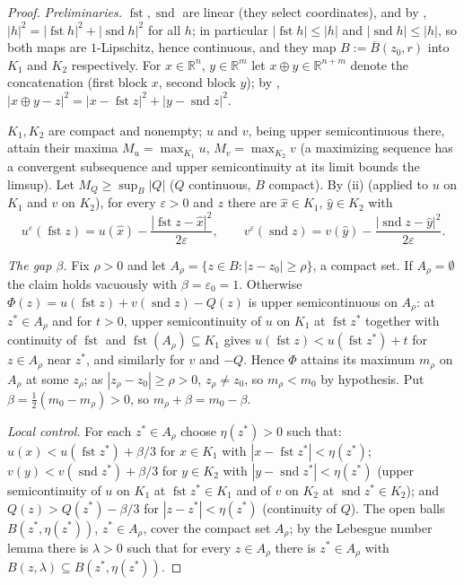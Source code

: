\begin{proof}
\emph{Preliminaries.} $\operatorname{fst},\operatorname{snd}$ are linear (they select coordinates), and by , $|h|^2=|\operatorname{fst}h|^2+|\operatorname{snd}h|^2$ for all $h$; in particular $|\operatorname{fst}h|\le|h|$ and $|\operatorname{snd}h|\le|h|$, so both maps are $1$-Lipschitz, hence continuous, and they map $B:=\overline B(z_0,r)$ into $K_1$ and $K_2$ respectively. For $x\in\mathbb R^n$, $y\in\mathbb R^m$ let $x\oplus y\in\mathbb R^{n+m}$ denote the concatenation (first block $x$, second block $y$); by , $|x\oplus y-z|^2=|x-\operatorname{fst}z|^2+|y-\operatorname{snd}z|^2$.

$K_1,K_2$ are compact and nonempty; $u$ and $v$, being upper semicontinuous there, attain their maxima $M_u=\max_{K_1}u$, $M_v=\max_{K_2}v$ (a maximizing sequence has a convergent subsequence and upper semicontinuity at its limit bounds the limsup). Let $M_Q\ge\sup_B|Q|$ ($Q$ continuous, $B$ compact). By (ii) (applied to $u$ on $K_1$ and $v$ on $K_2$), for every $\varepsilon>0$ and $z$ there are $\hat x\in K_1$, $\hat y\in K_2$ with
\[
u^\varepsilon(\operatorname{fst}z)=u(\hat x)-\frac{|\operatorname{fst}z-\hat x|^2}{2\varepsilon},\qquad v^\varepsilon(\operatorname{snd}z)=v(\hat y)-\frac{|\operatorname{snd}z-\hat y|^2}{2\varepsilon}. \tag{1}
\]

\emph{The gap $\beta$.} Fix $\rho>0$ and let $A_\rho=\{z\in B:|z-z_0|\ge\rho\}$, a compact set. If $A_\rho=\emptyset$ the claim holds vacuously with $\beta=\varepsilon_0=1$. Otherwise $\Phi(z)=u(\operatorname{fst}z)+v(\operatorname{snd}z)-Q(z)$ is upper semicontinuous on $A_\rho$: at $z^*\in A_\rho$ and for $t>0$, upper semicontinuity of $u$ on $K_1$ at $\operatorname{fst}z^*$ together with continuity of $\operatorname{fst}$ and $\operatorname{fst}(A_\rho)\subseteq K_1$ gives $u(\operatorname{fst}z)<u(\operatorname{fst}z^*)+t$ for $z\in A_\rho$ near $z^*$, and similarly for $v$ and $-Q$. Hence $\Phi$ attains its maximum $m_\rho$ on $A_\rho$ at some $z_\rho$; as $|z_\rho-z_0|\ge\rho>0$, $z_\rho\neq z_0$, so $m_\rho<m_0$ by hypothesis. Put $\beta=\frac12(m_0-m_\rho)>0$, so $m_\rho+\beta=m_0-\beta$.

\emph{Local control.} For each $z^*\in A_\rho$ choose $\eta(z^*)>0$ such that: $u(x)<u(\operatorname{fst}z^*)+\beta/3$ for $x\in K_1$ with $|x-\operatorname{fst}z^*|<\eta(z^*)$; $v(y)<v(\operatorname{snd}z^*)+\beta/3$ for $y\in K_2$ with $|y-\operatorname{snd}z^*|<\eta(z^*)$ (upper semicontinuity of $u$ on $K_1$ at $\operatorname{fst}z^*\in K_1$ and of $v$ on $K_2$ at $\operatorname{snd}z^*\in K_2$); and $Q(z)>Q(z^*)-\beta/3$ for $|z-z^*|<\eta(z^*)$ (continuity of $Q$). The open balls $B(z^*,\eta(z^*))$, $z^*\in A_\rho$, cover the compact set $A_\rho$; by the Lebesgue number lemma there is $\lambda>0$ such that for every $z\in A_\rho$ there is $z^*\in A_\rho$ with $B(z,\lambda)\subseteq B(z^*,\eta(z^*))$.


\end{proof}
